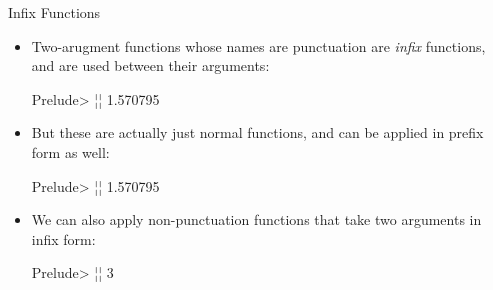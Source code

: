 \documentclass[xcolor=dvipsnames]{beamer}          %
\newcommand{\lH}[1]{\color{MidnightBlue}{#1}}
\begin{document}
\begin{frame}[fragile]{Infix Functions}
\begin{itemize}
    \item Two-arugment functions whose names are punctuation are
        \emph{infix} functions, and are used between their arguments:
        \begin{olisting}
            Prelude> ¦\lH{3.14159 / 2}¦
            1.570795
        \end{olisting}
    \item But these are actually just normal functions, and can be
        applied in prefix form as well:
        \begin{olisting}
            Prelude> ¦\lH{(/) 3.14159 2}¦
            1.570795
        \end{olisting}
    \item We can also apply non-punctuation functions that take two
        arguments in infix form:
        \begin{olisting}
            Prelude> ¦\lH{15 `mod` 4}¦
            3
        \end{olisting}
\end{itemize}
\end{frame}
\end{document}
